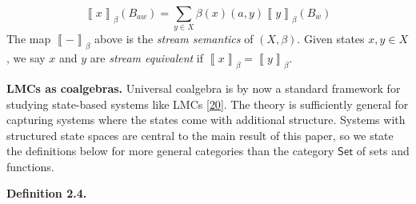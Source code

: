 \hypertarget{html:S2.Ex2.m1}{}\[\left\llbracket{x}\right\rrbracket_{\beta}(B_{aw})=\sum_{y\in X}\beta(x)(a,y)\left\llbracket{y}\right\rrbracket_{\beta}(B_{w})\]      %
\hypertarget{html:S2.SS0.SSS0.P0.SPx2.p4}{} The map %
\hypertarget{html:S2.SS0.SSS0.P0.SPx2.p4.m1}{}\({\left\llbracket{-}\right\rrbracket_{\beta}}\) above is the \emph{stream semantics} of %
\hypertarget{html:S2.SS0.SSS0.P0.SPx2.p4.m2}{}\({(X,\beta)}\). Given states %
\hypertarget{html:S2.SS0.SSS0.P0.SPx2.p4.m3}{}\({x,y\in X}\), we say %
\hypertarget{html:S2.SS0.SSS0.P0.SPx2.p4.m4}{}\({x}\) and %
\hypertarget{html:S2.SS0.SSS0.P0.SPx2.p4.m5}{}\({y}\) are \emph{stream equivalent} if %
\hypertarget{html:S2.SS0.SSS0.P0.SPx2.p4.m6}{}\({\left\llbracket{x}\right\rrbracket_{\beta}=\left\llbracket{y}\right\rrbracket_{\beta}}\).
\par\medskip
\hypertarget{html:S2.SS0.SSS0.P0.SPx3}{} \par\noindent\textbf{LMCs as coalgebras.}\quad  %
\hypertarget{html:S2.SS0.SSS0.P0.SPx3.p1}{} Universal coalgebra is by now a standard framework for studying state-based systems like LMCs [\hyperlink{html:bib.bib20}{20}]. The theory is sufficiently general for capturing systems where the states come with additional structure. Systems with structured state spaces are central to the main result of this paper, so we state the definitions below for more general categories than the category %
\hypertarget{html:S2.SS0.SSS0.P0.SPx3.p1.m1}{}\({\mathsf{Set}}\) of sets and functions.
\par\medskip
\hypertarget{html:S2.Thmtheorem4}{} \par\noindent\textbf{\textbf{Definition 2.4}\textbf{.}}\quad  %
